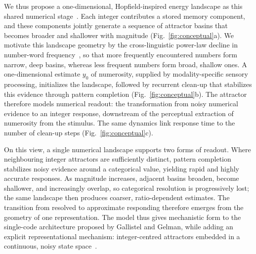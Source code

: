 \documentclass[Afour,sageh,times]{sagej}
\newif\ifmarkrevisions
\newcommand{\revised}[1]{\ifmarkrevisions{\color{red}#1}\else#1\fi}
\begin{document}
We thus propose a one-dimensional, Hopfield-inspired energy landscape as this shared numerical stage~\citep{hopfield_neural_1982,ramsauer_hopfield_2021}. Each integer contributes a stored memory component, and these components jointly generate a sequence of attractor basins that becomes broader and shallower with magnitude (Fig.~\ref{fig:conceptual}a). We motivate this landscape geometry by the cross-linguistic power-law decline in number-word frequency~\citep{dehaene_cross-linguistic_1992}, so that more frequently encountered numbers form narrow, deep basins, whereas less frequent numbers form broad, shallow ones. A one-dimensional estimate $y_0$ of numerosity, supplied by modality-specific sensory processing, initializes the landscape, followed by recurrent clean-up that stabilizes this evidence through pattern completion (Fig.~\ref{fig:conceptual}b). \revised{The attractor therefore models numerical readout: the transformation from noisy numerical evidence to an integer response, downstream of the perceptual extraction of numerosity from the stimulus. The same dynamics link response time to the number of clean-up steps (Fig.~\ref{fig:conceptual}c).}

On this view, a single numerical landscape supports two forms of readout. Where neighbouring integer attractors are sufficiently distinct, pattern completion stabilizes noisy evidence around a categorical value, yielding rapid and highly accurate responses. As magnitude increases, adjacent basins broaden, become shallower, and increasingly overlap, so categorical resolution is progressively lost; the same landscape then produces coarser, ratio-dependent estimates. The transition from resolved to approximate responding therefore emerges from the geometry of one representation. The model thus gives mechanistic form to the single-code architecture proposed by Gallistel and Gelman, while adding an explicit representational mechanism: integer-centred attractors embedded in a continuous, noisy state space~\citep{gallistel_preverbal_1992, gallistel_non-verbal_2000}.
\end{document}
